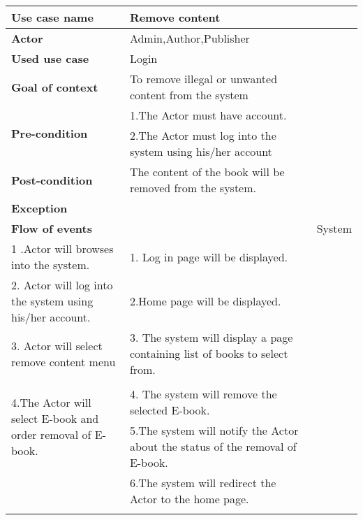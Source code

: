 \begin{table}[h]
\begin{adjustwidth}{-2 cm}{}
\caption{Use case description for Remove  content}

\begin{longtable}{|l|l|l|}
\hline \textbf{Use case name} & Remove content \\
\hline \textbf{Actor} &  Admin,Author,Publisher \\
\hline \textbf{Used use case} &Login \\
\hline \textbf{Goal of context} & To remove illegal or unwanted  content from the system  \\
\hline \multirow{2}{*}{ \textbf{Pre-condition}} & 
	1.The Actor must have account. \\&
	2.The Actor must log into the system  using his/her account\\
\hline \textbf{Post-condition} & The content of the book  will be removed from the system. \\
\hline \textbf{Exception} &  \\
\hline \textbf{Flow of events} &  
	\begin{tabular}{p{5 cm}|p{5 cm}}  Actor & System \\
		\hline 1 .Actor will browses into the system. & 1.  Log in  page will be displayed. \\
		\hline 2. Actor will log into the system using his/her account. & 2.Home page will be displayed.\\
		\hline 3. Actor will  select remove content menu & 3. The system will display a page containing list of books to select from.\\
		\hline \multirow{3}{5 cm}{4.The Actor will select E-book and order removal of E-book.}\\
			 &4. The system will remove the selected E-book.\\
			 &5.The system will notify the  Actor about the status of the removal of E-book.\\
			 &6.The system will redirect the Actor to the home page. \\
		\hline
	\end{tabular}
\end{longtable}

\end{adjustwidth}
\end{table}



